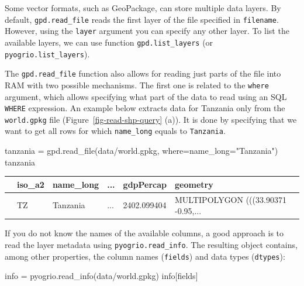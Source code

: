 \documentclass[
  letterpaper,
]{krantz}
\newenvironment{Shaded}{\begin{snugshade}}{\end{snugshade}}
\newcommand{\NormalTok}[1]{\textcolor[rgb]{0.00,0.23,0.31}{#1}}
\newcommand{\OperatorTok}[1]{\textcolor[rgb]{0.37,0.37,0.37}{#1}}
\newcommand{\StringTok}[1]{\textcolor[rgb]{0.13,0.47,0.30}{#1}}
\begin{document}
Some vector formats, such as GeoPackage, can store multiple data layers.
By default, \texttt{gpd.read\_file} reads the first layer of the file
specified in \texttt{filename}. However, using the \texttt{layer}
argument you can specify any other layer. To list the available layers,
we can use function \texttt{gpd.list\_layers} (or
\texttt{pyogrio.list\_layers}).

The \texttt{gpd.read\_file} function also allows for reading just parts
of the file into RAM with two possible mechanisms. The first one is
related to the \texttt{where} argument, which allows specifying what
part of the data to read using an SQL \texttt{WHERE} expression. An
example below extracts data for Tanzania only from the
\texttt{world.gpkg} file (Figure~\ref{fig-read-shp-query} (a)). It is
done by specifying that we want to get all rows for which
\texttt{name\_long} equals to
\texttt{\textquotesingle{}Tanzania\textquotesingle{}}.

\begin{Shaded}
\begin{Highlighting}[]
\NormalTok{tanzania }\OperatorTok{=}\NormalTok{ gpd.read\_file(}\StringTok{\textquotesingle{}data/world.gpkg\textquotesingle{}}\NormalTok{, where}\OperatorTok{=}\StringTok{\textquotesingle{}name\_long="Tanzania"\textquotesingle{}}\NormalTok{)}
\NormalTok{tanzania}
\end{Highlighting}
\end{Shaded}

\begin{longtable}[]{@{}llllll@{}}
\toprule\noalign{}
& iso\_a2 & name\_long & ... & gdpPercap & geometry \\
\midrule\noalign{}
\endhead
\bottomrule\noalign{}
\endlastfoot
0 & TZ & Tanzania & ... & 2402.099404 & MULTIPOLYGON (((33.90371
-0.95,... \\
\end{longtable}

If you do not know the names of the available columns, a good approach
is to read the layer metadata using \texttt{pyogrio.read\_info}. The
resulting object contains, among other properties, the column names
(\texttt{fields}) and data types (\texttt{dtypes}):

\begin{Shaded}
\begin{Highlighting}[]
\NormalTok{info }\OperatorTok{=}\NormalTok{ pyogrio.read\_info(}\StringTok{\textquotesingle{}data/world.gpkg\textquotesingle{}}\NormalTok{)}
\NormalTok{info[}\StringTok{\textquotesingle{}fields\textquotesingle{}}\NormalTok{]}
\end{Highlighting}
\end{Shaded}
\end{document}
